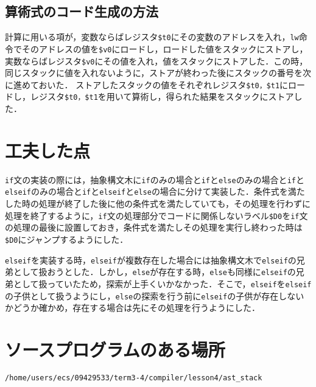 \documentclass{jarticle}[11pt]
\begin{document}
\subsection{算術式のコード生成の方法}
計算に用いる項が，変数ならばレジスタ\verb|$t0|にその変数のアドレスを入れ，\verb|lw|命令でそのアドレスの値を\verb|$v0|にロードし，ロードした値をスタックにストアし，実数ならばレジスタ\verb|$v0|にその値を入れ，値をスタックにストアした．この時，同じスタックに値を入れないように，ストアが終わった後にスタックの番号を次に進めておいた．
ストアしたスタックの値をそれぞれレジスタ\verb|$t0，$t1|にロードし，レジスタ\verb|$t0，$t1|を用いて算術し，得られた結果をスタックにストアした．

\section{工夫した点}
\verb|if|文の実装の際には，抽象構文木に\verb|if|のみの場合と\verb|if|と\verb|else|のみの場合と\verb|if|と\verb|elseif|のみの場合と\verb|if|と\verb|elseif|と\verb|else|の場合に分けて実装した．条件式を満たした時の処理が終了した後に他の条件式を満たしていても，その処理を行わずに処理を終了するように，\verb|if|文の処理部分でコードに関係しないラベル\verb|$D0|を\verb|if|文の処理の最後に設置しておき，条件式を満たしその処理を実行し終わった時は\verb|$D0|にジャンプするようにした．

\verb|elseif|を実装する時，\verb|elseif|が複数存在した場合には抽象構文木で\verb|elseif|の兄弟として扱おうとした．しかし，\verb|else|が存在する時，\verb|else|も同様に\verb|elseif|の兄弟として扱っていたため，探索が上手くいかなかった．そこで，\verb|elseif|を\verb|elseif|の子供として扱うようにし，\verb|else|の探索を行う前に\verb|elseif|の子供が存在しないかどうか確かめ，存在する場合は先にその処理を行うようにした．

\section{ソースプログラムのある場所}
\begin{verbatim}
/home/users/ecs/09429533/term3-4/compiler/lesson4/ast_stack
\end{verbatim}

\end{document}
